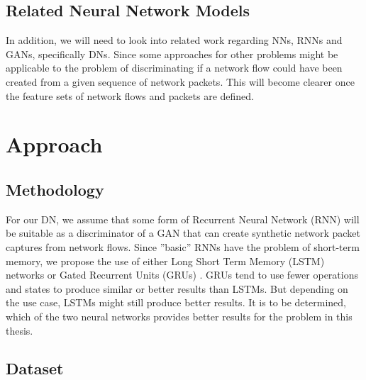 \documentclass[
	ngerman,
	ruledheaders=section,%
	class=report,%
	thesis={type=bachelor},%
	accentcolor=9c,%
	custommargins=true,%
	marginpar=false,%
	parskip=half-,%
	fontsize=11pt,%
]{tudapub}
\begin{document}
\section{Related Neural Network Models}

In addition, we will need to look into related work regarding NNs, RNNs and GANs, specifically DNs.
Since some approaches for other problems might be applicable to the problem of discriminating if a network flow could have been created from a given sequence of network packets.
This will become clearer once the feature sets of network flows and packets are defined.




\chapter{Approach}

\section{Methodology}

For our DN, we assume that some form of Recurrent Neural Network (RNN) will be suitable as a discriminator of a GAN that can create synthetic network packet captures from network flows.
Since ''basic'' RNNs have the problem of short-term memory, we propose the use of either Long Short Term Memory (LSTM) networks \cite{hochreiterLongShortTermMemory1997} or Gated Recurrent Units (GRUs) \cite{bahdanauNeuralMachineTranslation2016}.
GRUs tend to use fewer operations and states to produce similar or better results than LSTMs.
But depending on the use case, LSTMs might still produce better results.
It is to be determined, which of the two neural networks provides better results for the problem in this thesis.


\section{Dataset}
\end{document}
